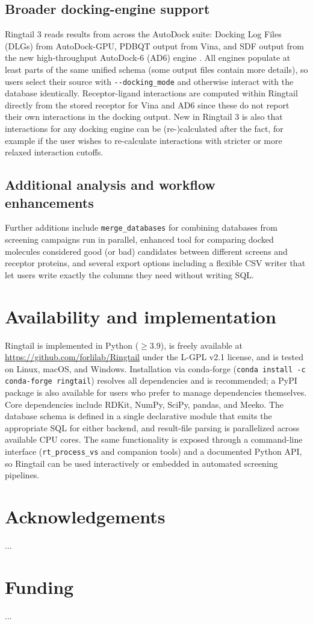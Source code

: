 \documentclass[unnumsec,webpdf,contemporary,large]{oup-authoring-template}
\begin{document}
\subsection{Broader docking-engine support}
Ringtail 3 reads results from across the AutoDock suite: Docking Log Files (DLGs) from AutoDock-GPU, PDBQT output from Vina, and SDF output from the new high-throughput AutoDock-6 (AD6) engine \citep{AD6citation}. All engines populate at least parts of the same unified schema (some output files contain more details), so users select their source with \texttt{-{}-docking\_mode} and otherwise interact with the database identically. Receptor-ligand interactions are computed within Ringtail directly from the stored receptor for Vina and AD6 since these do not report their own interactions in the docking output. New in Ringtail 3 is also that interactions for any docking engine can be (re-)calculated after the fact, for example if the user wishes to re-calculate interactions with stricter or more relaxed interaction cutoffs. 

\subsection{Additional analysis and workflow enhancements}
Further additions include \texttt{merge\_databases} for combining databases from screening campaigns run in parallel, enhanced tool for comparing docked molecules considered good (or bad) candidates between different screens and receptor proteins, and several export options including a flexible CSV writer that let users write exactly the columns they need without writing SQL.

\section{Availability and implementation}
Ringtail is implemented in Python ($\geq$3.9), is freely available at \url{https://github.com/forlilab/Ringtail} under the L-GPL v2.1 license, and is tested on Linux, macOS, and Windows. Installation via conda-forge (\texttt{conda install -c conda-forge ringtail}) resolves all dependencies and is recommended; a PyPI package is also available for users who prefer to manage dependencies themselves. Core dependencies include RDKit, NumPy, SciPy, pandas, and Meeko. The database schema is defined in a single declarative module that emits the appropriate SQL for either backend, and result-file parsing is parallelized across available CPU cores. The same functionality is exposed through a command-line interface (\texttt{rt\_process\_vs} and companion tools) and a documented Python API, so Ringtail can be used interactively or embedded in automated screening pipelines.

\section*{Acknowledgements}
...

\section*{Funding}
...



\end{document}

